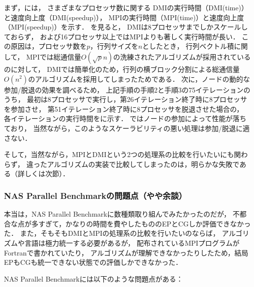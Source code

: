 \documentclass[10pt]{jsarticle}
\begin{document}
まず，には，
さまざまなプロセッサ数に関する
DMIの実行時間（DMI(time)）と速度向上度（DMI(speedup)），
MPIの実行時間（MPI(time)）と速度向上度（MPI(speedup)）を示す．
を見ると，
DMIは8プロセッサまでしかスケールしておらず，
および16プロセッサ以上ではMPIよりも著しく実行時間が長い．
この原因は，プロセッサ数を$p$，行列サイズを$n$としたとき，
行列ベクトル積に関して，
MPIでは総通信量$O(\sqrt pn)$の洗練されたアルゴリズムが採用されているのに対して，
DMIでは簡単化のため，行列の横ブロック分割による総通信量$O(n^2)$のアルゴリズムを採用してしまったためである．
次に，ノードの動的な参加/脱退の効果を調べるため，
上記手順の手順2と手順3の75イテレーションのうち，
最初は8プロセッサで実行し，第26イテレーション終了時に8プロセッサを参加させ，
第51イテレーション終了時に8プロセッサを脱退させた場合の，
各イテレーションの実行時間をに示す．
ではノードの参加によって性能が落ちており，
当然ながら，このようなスケーラビリティの悪い処理は参加/脱退に適さない．

そして，当然ながら，MPIとDMIという2つの処理系の比較を行いたいにも関わらず，
違ったアルゴリズムの実装で比較してしまったのは，明らかな失敗である（詳しくは次節）．

\subsubsection{NAS Parallel Benchmarkの問題点（やや余談）}
\label{sec:perform_nas}

本当は，NAS Parallel Benchmarkに数種類取り組んでみたかったのだが，
不都合な点が多すぎて，かなりの時間を費やしたもののEPとCGしか評価できなかった．
また，そもそもDMIとMPIの処理系の比較を行いたいのならば，
アルゴリズムや言語は極力統一する必要があるが，
配布されているMPIプログラムがFortranで書かれていたり，
アルゴリズムが理解できなかったりしたため，結局EPもCGも統一できない状態での評価しかできなかった．

NAS Parallel Benchmarkには以下のような問題点がある：
\end{document}
